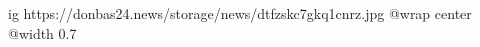  
 
 
 
 

\ifcmt
  ig https://donbas24.news/storage/news/dtfzskc7gkq1cnrz.jpg
  @wrap center
  @width 0.7
\fi
